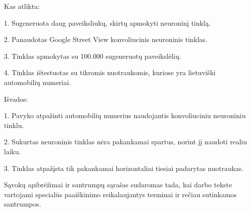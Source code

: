 \documentclass{VUMIFPSkursinis}
\begin{document}
Kas atlikta:

1. Sugeneruota daug paveiksliukų, skirtų apmokyti neuroninį tinklą.

2. Panaudotas Google Street View konvoliucinis neuroninis tinklas.

3. Tinklas apmokytas su 100.000 sugeneruotų paveikslėlių.

4. Tinklas ištestuotas su tikromis nuotraukomis, kuriose yra lietuviški automobilių numeriai.

Išvados:

1. Pavyko atpažinti automobilių numerius naudojantis konvoliuciniu neuroniniu tinklu.

2. Sukurtas neuroninis tinklas nėra pakankamai spartus, norint jį naudoti realiu laiku.

3. Tinklas atpažįsta tik pakankamai horizontaliai tiesiai padarytas nuotraukas.


\printbibliography[heading=bibintoc]  %

Sąvokų apibrėžimai ir santrumpų sąrašas sudaromas tada, kai darbo tekste
vartojami specialūs paaiškinimo reikalaujantys terminai ir rečiau sutinkamos
santrumpos.

\appendix  %
\end{document}
